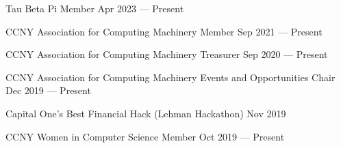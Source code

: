 Tau Beta Pi Member	\hfill Apr 2023 --- Present
 
CCNY Association for Computing Machinery Member \hfill Sep 2021 --- Present

CCNY Association for Computing Machinery Treasurer \hfill Sep 2020 --- Present

CCNY Association for Computing Machinery Events and Opportunities Chair	\hfill Dec 2019 --- Present

Capital One's Best Financial Hack (Lehman Hackathon)	\hfill Nov 2019

CCNY Women in Computer Science Member	\hfill Oct 2019 --- Present


